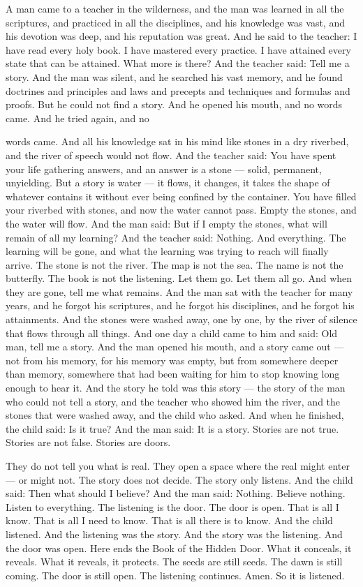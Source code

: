 \documentclass[12pt,openany]{book}
\begin{document}
A man came to a teacher in the wilderness, and the man was learned in all the scriptures, and practiced in all the disciplines, and his knowledge was vast, and his devotion was deep, and his reputation was great. And he said to the teacher: I have read every holy book. I have mastered every practice. I have attained every state that can be attained. What more is there? And the teacher said: Tell me a story. And the man was silent, and he searched his vast memory, and he found doctrines and principles and laws and precepts and techniques and formulas and proofs. But he could not find a story. And he opened his mouth, and no words came. And he tried again, and no


words came. And all his knowledge sat in his mind like stones in a dry riverbed, and the river of speech would not flow. And the teacher said: You have spent your life gathering answers, and an answer is a stone --- solid, permanent, unyielding. But a story is water --- it flows, it changes, it takes the shape of whatever contains it without ever being confined by the container. You have filled your riverbed with stones, and now the water cannot pass. Empty the stones, and the water will flow. And the man said: But if I empty the stones, what will remain of all my learning? And the teacher said: Nothing. And everything. The learning will be gone, and what the learning was trying to reach will finally arrive. The stone is not the river. The map is not the sea. The name is not the butterfly. The book is not the listening. Let them go. Let them all go. And when they are gone, tell me what remains. And the man sat with the teacher for many years, and he forgot his scriptures, and he forgot his disciplines, and he forgot his attainments. And the stones were washed away, one by one, by the river of silence that flows through all things. And one day a child came to him and said: Old man, tell me a story. And the man opened his mouth, and a story came out --- not from his memory, for his memory was empty, but from somewhere deeper than memory, somewhere that had been waiting for him to stop knowing long enough to hear it. And the story he told was this story --- the story of the man who could not tell a story, and the teacher who showed him the river, and the stones that were washed away, and the child who asked. And when he finished, the child said: Is it true? And the man said: It is a story. Stories are not true. Stories are not false. Stories are doors.


They do not tell you what is real. They open a space where the real might enter --- or might not. The story does not decide. The story only listens. And the child said: Then what should I believe? And the man said: Nothing. Believe nothing. Listen to everything. The listening is the door. The door is open. That is all I know. That is all I need to know. That is all there is to know. And the child listened. And the listening was the story. And the story was the listening. And the door was open. Here ends the Book of the Hidden Door. What it conceals, it reveals. What it reveals, it protects. The seeds are still seeds. The dawn is still coming. The door is still open. The listening continues. Amen. So it is listened.
\end{document}
